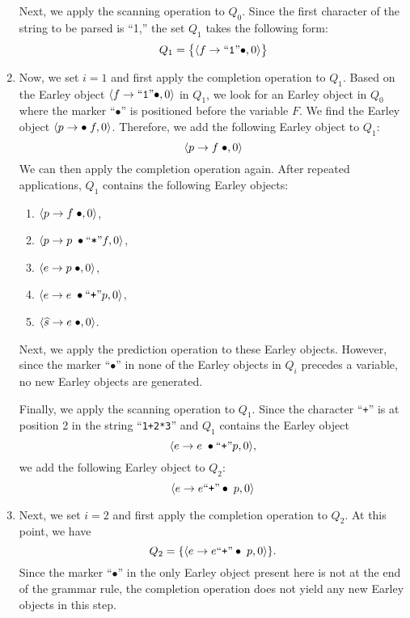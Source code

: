 \begin{enumerate}
      Next, we apply the scanning operation to $Q_0$. Since the first character of the string to be parsed is
      “1,” the set $Q_1$ takes the following form:   
      \[
        Q_1 = \bigl\{ \pair(f \rightarrow \squoted{1} \bullet, 0) \bigr\}
      \]
\item Now, we set $i = 1$ and first apply the completion operation to $Q_1$. Based on the Earley object
      $\pair(f \rightarrow \squoted{1} \bullet, 0)$ in $Q_1$, we look for an Earley object in $Q_0$ where the marker
      “$\bullet$” is positioned before the variable $F$. We find the Earley object   
       $\pair(p \rightarrow \bullet\; f, 0)$. Therefore, we add the following Earley object to $Q_1$:   
       \[
         \pair(p \rightarrow f \;\bullet, 0)
       \]  
       We can then apply the completion operation again. After repeated applications, $Q_1$ contains the
       following Earley objects:  
       \begin{enumerate}
       \item $\pair(p \rightarrow f \;\bullet, 0)$, 
       \item $\pair(p \rightarrow p\;\bullet \squoted{*} f, 0)$, 
       \item $\pair(e \rightarrow p \; \bullet, 0)$,
       \item $\pair(e \rightarrow e\;\bullet \squoted{+} p, 0)$,
       \item $\pair(\widehat{s} \rightarrow e\;\bullet, 0)$.
       \end{enumerate}  
       Next, we apply the prediction operation to these Earley objects. However, since the marker “$\bullet$” in
       none of the Earley objects in $Q_i$ precedes a variable, no new Earley objects are generated.   

       Finally, we apply the scanning operation to $Q_1$. Since the character “\texttt{+}” is at position 2 in
       the string “\texttt{1+2*3}” and $Q_1$ contains the Earley object   
       \[
         \pair(e \rightarrow e\;\bullet \squoted{+} p, 0),
       \]  
       we add the following Earley object to $Q_2$:  
       \[
         \pair(e \rightarrow e \squoted{+}\bullet\; p, 0)
       \]  
\item Next, we set $i = 2$ and first apply the completion operation to $Q_2$. At this point, we have  
      \[
        Q_2 = \{ \pair(e \rightarrow e \squoted{+}\bullet\; p, 0) \}.
      \]  
      Since the marker “$\bullet$” in the only Earley object present here is not at the end of the grammar rule,
      the completion operation does not yield any new Earley objects in this step.   


\end{enumerate}
